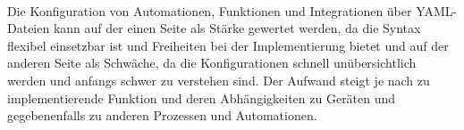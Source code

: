    \\
    Die Konfiguration von Automationen, Funktionen und Integrationen über YAML-Dateien kann auf der einen Seite als Stärke gewertet werden, 
    da die Syntax flexibel einsetzbar ist und Freiheiten bei der Implementierung bietet und auf der anderen Seite als Schwäche, da die 
    Konfigurationen schnell unübersichtlich werden und anfangs schwer zu verstehen sind. Der Aufwand steigt je nach zu implementierende 
    Funktion und deren Abhängigkeiten zu Geräten und gegebenenfalls zu anderen Prozessen und Automationen. 
